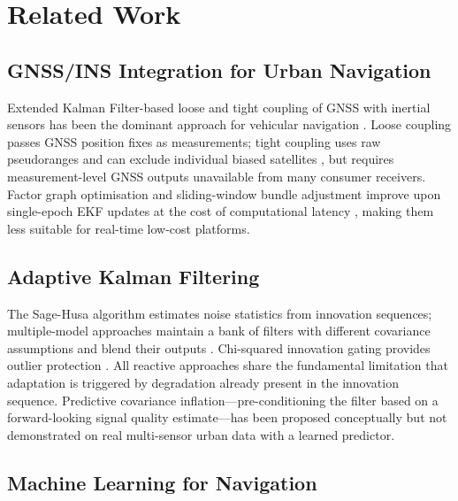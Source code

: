 \documentclass[journal]{IEEEtran}
\begin{document}
\section{Related Work}

\subsection{GNSS/INS Integration for Urban Navigation}

Extended Kalman Filter-based loose and tight coupling of GNSS with
inertial sensors has been the dominant approach for vehicular navigation
\cite{[AuthorYear_Groves_2013], [AuthorYear_Petovello_2015]}.  Loose
coupling passes GNSS position fixes as measurements; tight coupling uses
raw pseudoranges and can exclude individual biased satellites
\cite{[AuthorYear_tight_coupling_urban]}, but requires measurement-level
GNSS outputs unavailable from many consumer receivers.  Factor graph
optimisation and sliding-window bundle adjustment improve upon single-epoch
EKF updates at the cost of computational latency
\cite{[AuthorYear_factor_graph_GNSS_IMU]}, making them less suitable for
real-time low-cost platforms.

\subsection{Adaptive Kalman Filtering}

The Sage-Husa algorithm \cite{[AuthorYear_Sage_Husa]} estimates noise
statistics from innovation sequences; multiple-model approaches maintain
a bank of filters with different covariance assumptions and blend their
outputs \cite{[AuthorYear_IMM_GNSS]}.  Chi-squared innovation gating
provides outlier protection \cite{[AuthorYear_chi2_GNSS]}.  All reactive
approaches share the fundamental limitation that adaptation is triggered
by degradation already present in the innovation sequence.  Predictive
covariance inflation---pre-conditioning the filter based on a forward-looking
signal quality estimate---has been proposed conceptually
\cite{[AuthorYear_predictive_adaptive_KF]} but not demonstrated on real
multi-sensor urban data with a learned predictor.

\subsection{Machine Learning for Navigation}
\end{document}
